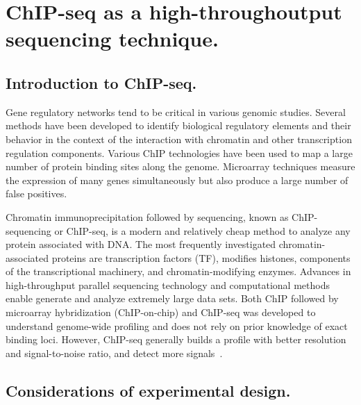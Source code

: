 \chapter{ChIP-seq as a high-throughoutput sequencing technique.}

\section{Introduction to ChIP-seq.}
Gene regulatory networks tend to be critical in various genomic studies. Several methods have been developed to identify biological regulatory elements and their behavior in the context of the interaction with chromatin and other transcription regulation components. Various ChIP technologies have been used to map a large number of protein binding sites along the genome. Microarray techniques measure the expression of many genes simultaneously but also produce a large number of false positives. 

Chromatin immunoprecipitation followed by sequencing, known as ChIP-sequencing or ChIP-seq, is a modern and relatively cheap method to analyze any protein associated with DNA. 
The most frequently investigated chromatin-associated proteins are transcription factors (TF), modifies histones, components of the transcriptional machinery, and chromatin-modifying enzymes.
Advances in high-throughput parallel sequencing technology and computational methods enable generate and analyze extremely large data sets. 
Both ChIP followed by microarray hybridization (ChIP-on-chip) and ChIP-seq was developed to understand genome-wide profiling and does not rely on prior knowledge of exact binding loci.
However, ChIP-seq generally builds a profile with better resolution and signal-to-noise ratio, and detect more signals~\cite{park2009chip}.














\section{Considerations of experimental design.}

